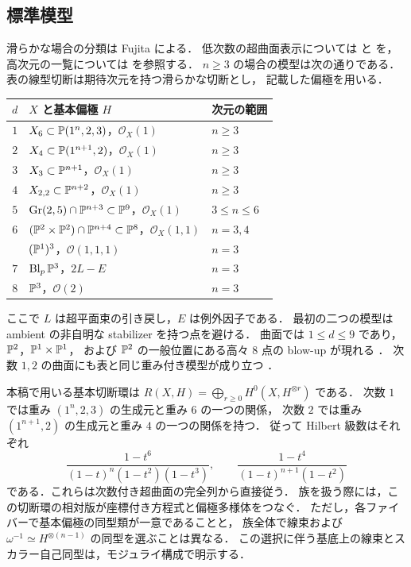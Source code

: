\subsection{標準模型}
滑らかな場合の分類は Fujita による．
低次数の超曲面表示については
\cite[Theorems (2.1), (2.2), (2.5)]{Fujita1980} と
\cite[Theorems (14.6), (16.7)]{Fujita1984} を，
高次元の一覧については \cite[Theorem 1.2]{KP2023} を参照する．
$n\geq3$ の場合の模型は次の通りである．表の線型切断は期待次元を持つ滑らかな切断とし，
記載した偏極を用いる．
\begin{center}
\begin{tabular}{@{}cll@{}}
\toprule
$d$ & $X$ と基本偏極 $H$ & 次元の範囲\\
\midrule
$1$ & $X_6\subset\mathbb P(1^n,2,3)$，$\mathcal O_X(1)$ & $n\geq3$\\
$2$ & $X_4\subset\mathbb P(1^{n+1},2)$，$\mathcal O_X(1)$ & $n\geq3$\\
$3$ & $X_3\subset\mathbb P^{n+1}$，$\mathcal O_X(1)$ & $n\geq3$\\
$4$ & $X_{2,2}\subset\mathbb P^{n+2}$，$\mathcal O_X(1)$ & $n\geq3$\\
$5$ & $\operatorname{Gr}(2,5)\cap\mathbb P^{n+3}\subset\mathbb P^9$，$\mathcal O_X(1)$ & $3\leq n\leq6$\\
$6$ & $(\mathbb P^2\times\mathbb P^2)\cap\mathbb P^{n+4}\subset\mathbb P^8$，$\mathcal O_X(1,1)$ & $n=3,4$\\
 & $(\mathbb P^1)^3$，$\mathcal O(1,1,1)$ & $n=3$\\
$7$ & $\operatorname{Bl}_{p}\mathbb P^3$，$2L-E$ & $n=3$\\
$8$ & $\mathbb P^3$，$\mathcal O(2)$ & $n=3$\\
\bottomrule
\end{tabular}
\end{center}
ここで $L$ は超平面束の引き戻し，$E$ は例外因子である．
最初の二つの模型は ambient の非自明な stabilizer を持つ点を避ける．
曲面では $1\leq d\leq9$ であり，$\mathbb P^2$，$\mathbb P^1\times\mathbb P^1$，
および $\mathbb P^2$ の一般位置にある高々 $8$ 点の blow-up が現れる
\cite[\S3]{Fujita1980}．
次数 $1,2$ の曲面にも表と同じ重み付き模型が成り立つ
\cite[Theorem 2.5(v)--(vii)]{CP2021}．

本稿で用いる基本切断環は
$R(X,H)=\bigoplus_{r\geq0}H^0(X,H^{\otimes r})$ である．
次数 $1$ では重み $(1^n,2,3)$ の生成元と重み $6$ の一つの関係，
次数 $2$ では重み $(1^{n+1},2)$ の生成元と重み $4$ の一つの関係を持つ．
従って Hilbert 級数はそれぞれ
\begin{equation}
 \frac{1-t^6}{(1-t)^n(1-t^2)(1-t^3)},
 \qquad
 \frac{1-t^4}{(1-t)^{n+1}(1-t^2)}
 \label{eq:del-pezzo-hilbert-series}
\end{equation}
である．これらは次数付き超曲面の完全列から直接従う．
族を扱う際には，この切断環の相対版が座標付き方程式と偏極多様体をつなぐ．
ただし，各ファイバーで基本偏極の同型類が一意であることと，
族全体で線束および $\omega^{-1}\simeq H^{\otimes(n-1)}$ の同型を選ぶことは異なる．
この選択に伴う基底上の線束とスカラー自己同型は，モジュライ構成で明示する．

